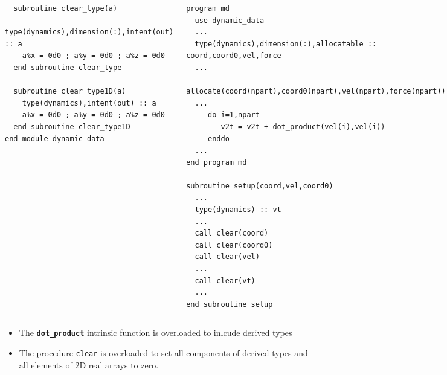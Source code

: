 \documentclass[slidestop,mathserif,compress,xcolor=svgnames]{beamer}
\newcommand{\bftt}[1]{\textbf{\texttt{#1}}}
\newenvironment{eblock}[0]
{
\begin{beamerboxesrounded}[upper=uppercol2,lower=lowercol2,shadow=true]}
{\end{beamerboxesrounded}}
\begin{document}
\begin{frame}
{\begin{columns}
\begin{eblock}{}
\begin{verbatim}
  subroutine clear_type(a)
    type(dynamics),dimension(:),intent(out) :: a
    a%x = 0d0 ; a%y = 0d0 ; a%z = 0d0
  end subroutine clear_type

  subroutine clear_type1D(a)
    type(dynamics),intent(out) :: a
    a%x = 0d0 ; a%y = 0d0 ; a%z = 0d0
  end subroutine clear_type1D
end module dynamic_data
        \end{verbatim}
      \end{eblock}
      \column{6cm}
      \vspace{-0.5cm}
      \begin{eblock}{}
        \begin{verbatim}
program md
  use dynamic_data
  ...
  type(dynamics),dimension(:),allocatable :: coord,coord0,vel,force
  ...
  allocate(coord(npart),coord0(npart),vel(npart),force(npart))
  ...
     do i=1,npart
        v2t = v2t + dot_product(vel(i),vel(i))
     enddo
  ...
end program md

subroutine setup(coord,vel,coord0)
  ...
  type(dynamics) :: vt
  ...
  call clear(coord)
  call clear(coord0)
  call clear(vel)
  ...
  call clear(vt)
  ...
end subroutine setup
        \end{verbatim}
      \end{eblock}
    \end{columns}
  }
  \begin{itemize}
    \item The \bftt{dot\_product} intrinsic function is overloaded to inlcude derived types
    \item The procedure \texttt{clear} is overloaded to set all components of derived types and all elements of 2D real arrays to zero. 
  \end{itemize}
\end{frame}
\end{document}
